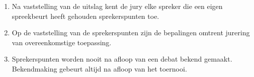 
\begin{enumerate}
\item Na vaststelling van de uitslag kent de jury elke spreker die een eigen spreekbeurt heeft gehouden sprekerspunten toe. 
\item Op de vaststelling van de sprekerspunten zijn de bepalingen omtrent jurering van overeenkomstige toepassing.
\item Sprekerspunten worden nooit na afloop van een debat bekend gemaakt. Bekendmaking gebeurt altijd na afloop van het toernooi.
\end{enumerate}
